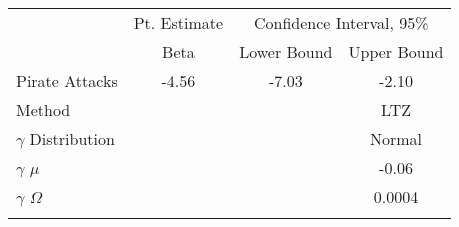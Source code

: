 \begin{center}
\begin{tabular}{lccc}
\hline \noalign{\smallskip} & Pt. Estimate & \multicolumn{2}{c}{Confidence Interval, 95\%}\\
 & Beta & Lower Bound & Upper Bound\\
\noalign{\smallskip}\hline \noalign{\smallskip}Pirate Attacks & -4.56 & -7.03 & -2.10\\
\hline Method &  &  & LTZ\\
$\gamma$ Distribution &  &  & Normal\\
$\gamma$ $\mu$ &  &  & -0.06\\
$\gamma$ $\Omega$ &  &  & 0.0004\\
\noalign{\smallskip}\end{tabular}\\
\end{center}
